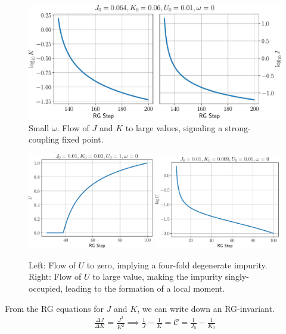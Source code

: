 \documentclass[twoside]{report}
\numberwithin{equation}{section}
\begin{document}
\begin{figure}[htpb!]
	\centering
	\includegraphics[width=\textwidth]{../figures/low_w_JK.pdf}
	\caption{Small \(\omega\). Flow of \(J\) and \(K\) to large values, signaling a strong-coupling fixed point.}
	\label{J_sc}
\end{figure}
\begin{figure}[htpb]
	\centering
	\includegraphics[width=0.49\textwidth]{../figures/U_irr.pdf}
	\includegraphics[width=0.49\textwidth]{../figures/U_rel.pdf}
	\caption{Left: Flow of \(U\) to zero, implying a four-fold degenerate impurity. Right: Flow of \(U\) to large value, making the impurity singly-occupied, leading to the formation of a local moment.}
	\label{U_flow}
\end{figure}
From the RG equations for \(J\) and \(K\), we can write down an RG-invariant.
\begin{equation}\begin{aligned}
	\label{rginv}
	\frac{\Delta J}{\Delta K} = \frac{J^2}{K^2} \implies \frac{1}{J} - \frac{1}{K} = \mathcal{C} = \frac{1}{J_0} - \frac{1}{K_0}
\end{aligned}\end{equation}
\end{document}
